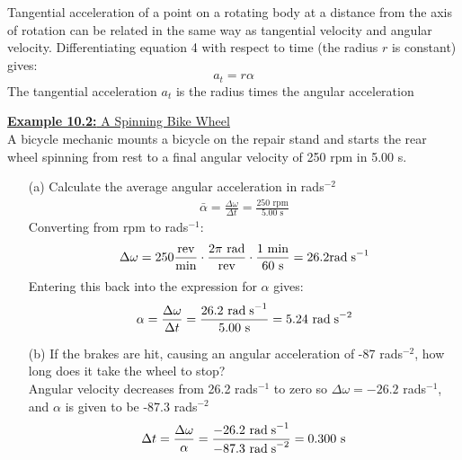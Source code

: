 \documentclass[a4paper]{article}
\let\bf\textbf
\begin{document}
Tangential acceleration of a point on a rotating body at a distance from the axis of rotation can be related in the same way as tangential velocity and angular velocity. Differentiating equation 4 with respect to time (the radius $r$ is constant) gives:
\begin{equation}
    a_t = r\alpha
\end{equation}
The tangential acceleration $a_t$ is the radius times the angular acceleration
\begin{shaded}
    \underline{\bf{Example 10.2:} A Spinning Bike Wheel}
    \vspace{2mm}\\
    A bicycle mechanic mounts a bicycle on the repair stand and starts the rear wheel spinning from rest to a final angular velocity of 250 rpm in 5.00 s.
    \begin{enumerate}
        \item[(a)] Calculate the average angular acceleration in rad\;s$^{-2}$
        \begin{align*}
            \displaystyle \bar{\alpha} = \frac{\Delta\omega}{\Delta t} = \frac{250\text{ rpm}}{5.00\text{ s}}
        \end{align*}
        Converting from rpm to rad\;s$^{-1}$:
        \begin{align*}
            \Delta\omega = 250\frac{\text{rev}}{\text{min}} \cdot \frac{2\pi\text{ rad}}{\text{rev}} \cdot \frac{1\text{ min}}{60\text{ s}} = 26.2\text{rad\;s}^{-1}
        \end{align*}
        Entering this back into the expression for $\alpha$ gives:
        \begin{align*}
            \alpha = \frac{\Delta\omega}{\Delta t} = \frac{26.2\text{ rad\;s}^{-1}}{5.00\text{ s}} = 5.24\text{ rad\;s}^{-2}
        \end{align*}
        \item[(b)] If the brakes are hit, causing an angular acceleration of -87 rad\;s$^{-2}$, how long does it take the wheel to stop?
        \vspace{1mm}\\
        Angular velocity decreases from 26.2 rad\;s$^{-1}$ to zero so $\Delta\omega = -26.2$ rad\;s$^{-1}$, and $\alpha$ is given to be -87.3 rad\;s$^{-2}$
        \begin{align*}
            \Delta t = \frac{\Delta\omega}{\alpha} = \frac{-26.2\text{ rad\;s}^{-1}}{-87.3\text{ rad\;s}^{-2}} = 0.300\text{ s}
        \end{align*}
    \end{enumerate}
\end{shaded}
\end{document}
